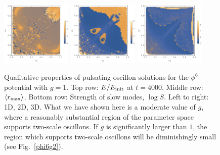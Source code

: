 \documentclass[11pt]{book}
\begin{document}
\begin{figure}[p]
    \includegraphics[width=0.3\textwidth]{plot/slow-mode-logscale-phi6-1d.png}
    \includegraphics[width=0.3\textwidth]{plot/slow-mode-logscale-phi6-2d.png}
    \includegraphics[width=0.3\textwidth]{plot/slow-mode-logscale-phi6-3d.png}
    \caption{Qualitative properties of pulsating oscillon solutions for the $\phi^6$ potential with $g=1$. Top row: $E/E_{\rm init}$ at $t=4000$.
      Middle row: $\langle r_{\rm max}\rangle$.
      Bottom row: Strength of slow modes, $\log{S}$.\quad
      Left to right: 1D, 2D, 3D. \qquad What we have shown here is a moderate value of $g$, where a reasonably substantial region of the parameter space supports two-scale oscillons. If $g$ is significantly larger than $1$, the region which supports two-scale oscillons will be diminishingly small (see Fig.~\ref{phi6g2}).}\label{phi6}
\end{figure}
\restoregeometry
\end{document}
